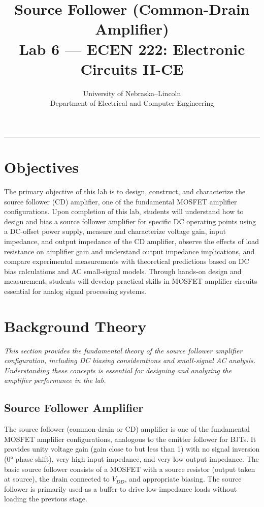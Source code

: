 \documentclass[10pt]{article}
\title{\textbf{\Huge Source Follower (Common-Drain Amplifier)}\\
\large Lab 6 — ECEN 222: Electronic Circuits II-CE}
\author{
\large University of Nebraska–Lincoln \\
\large Department of Electrical and Computer Engineering
}
\date{} %
\begin{document}
\thispagestyle{fancy}
\maketitle
\rule{\textwidth}{0.5pt}


\section{Objectives}

The primary objective of this lab is to design, construct, and characterize the source follower (CD) amplifier, one of the fundamental MOSFET amplifier configurations. Upon completion of this lab, students will understand how to design and bias a source follower amplifier for specific DC operating points using a DC-offset power supply, measure and characterize voltage gain, input impedance, and output impedance of the CD amplifier, observe the effects of load resistance on amplifier gain and understand output impedance implications, and compare experimental measurements with theoretical predictions based on DC bias calculations and AC small-signal models.  Through hands-on design and measurement, students will develop practical skills in MOSFET amplifier circuits essential for analog signal processing systems.


\section{Background Theory}

\textit{This section provides the fundamental theory of the source follower amplifier configuration, including DC biasing considerations and small-signal AC analysis. Understanding these concepts is essential for designing and analyzing the amplifier performance in the lab.} \\

\subsection{Source Follower Amplifier}

The source follower (common-drain or CD) amplifier is one of the fundamental MOSFET amplifier configurations, analogous to the emitter follower for BJTs. It provides unity voltage gain (gain close to but less than 1) with no signal inversion (0° phase shift), very high input impedance, and very low output impedance. The basic source follower consists of a MOSFET with a source resistor (output taken at source), the drain connected to $V_{DD}$, and appropriate biasing. The source follower is primarily used as a buffer to drive low-impedance loads without loading the previous stage.
\end{document}
